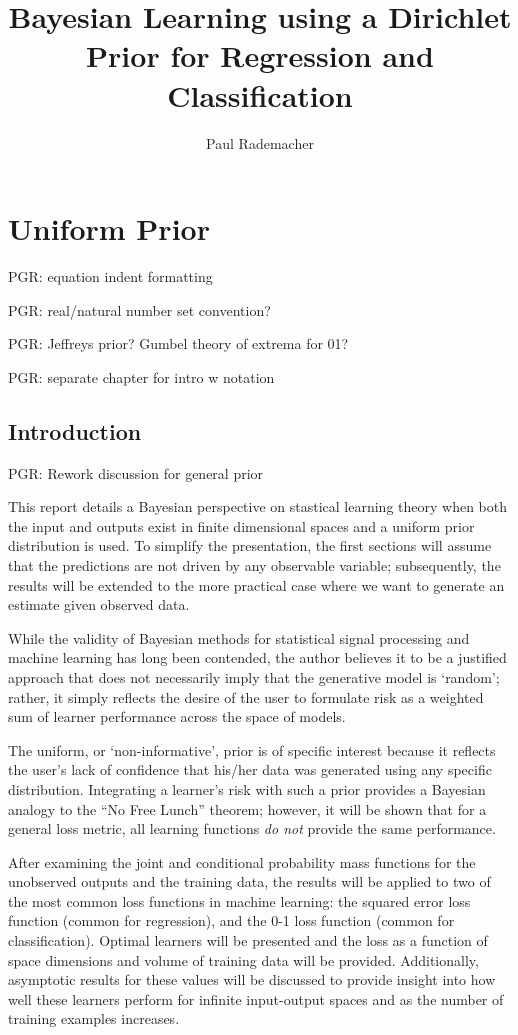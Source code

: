 \documentclass[12pt]{report}
\title{Bayesian Learning using a Dirichlet Prior for Regression and Classification}
\author{Paul Rademacher}
\begin{document}
\maketitle
\tableofcontents

\chapter{Uniform Prior}

PGR: equation indent formatting

PGR: real/natural number set convention?

PGR: Jeffreys prior? Gumbel theory of extrema for 01?

PGR: separate chapter for intro w notation


\section{Introduction}

PGR: Rework discussion for general prior



This report details a Bayesian perspective on stastical learning theory when both the input and outputs exist in finite dimensional spaces and a uniform prior distribution is used. To simplify the presentation, the first sections will assume that the predictions are not driven by any observable variable; subsequently, the results will be extended to the more practical case where we want to generate an estimate given observed data.

While the validity of Bayesian methods for statistical signal processing and machine learning has long been contended, the author believes it to be a justified approach that does not necessarily imply that the generative model is `random'; rather, it simply reflects the desire of the user to formulate risk as a weighted sum of learner performance across the space of models. 

The uniform, or `non-informative', prior is of specific interest because it reflects the user's lack of confidence that his/her data was generated using any specific distribution. Integrating a learner's risk with such a prior provides a Bayesian analogy to the ``No Free Lunch'' theorem; however, it will be shown that for a general loss metric, all learning functions \emph{do not} provide the same performance.

After examining the joint and conditional probability mass functions for the unobserved outputs and the training data, the results will be applied to two of the most common loss functions in machine learning: the squared error loss function (common for regression), and the 0-1 loss function (common for classification). Optimal learners will be presented and the loss as a function of space dimensions and volume of training data will be provided. Additionally, asymptotic results for these values will be discussed to provide insight into how well these learners perform for infinite input-output spaces and as the number of training examples increases. 
\end{document}
